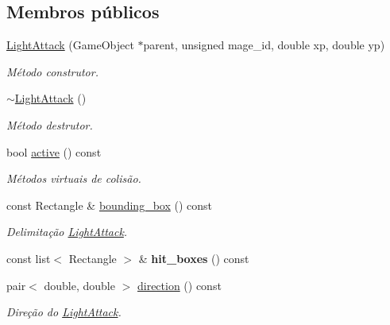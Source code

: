 \subsection*{Membros públicos}
\begin{DoxyCompactItemize}
\item 
\mbox{\hyperlink{classLightAttack_a85172d92441b302e99c4209df40792e6}{Light\+Attack}} (Game\+Object $\ast$parent, unsigned mage\+\_\+id, double xp, double yp)
\begin{DoxyCompactList}\small\item\em Método construtor. \end{DoxyCompactList}\item 
\mbox{\hyperlink{classLightAttack_acd73b8d61fd269e6077555a50e674cfb}{$\sim$\+Light\+Attack}} ()
\begin{DoxyCompactList}\small\item\em Método destrutor. \end{DoxyCompactList}\item 
bool \mbox{\hyperlink{classLightAttack_a69d89dd9e2374379fcdf6f464e87707c}{active}} () const
\begin{DoxyCompactList}\small\item\em Métodos virtuais de colisão. \end{DoxyCompactList}\item 
\mbox{\label{classLightAttack_a9fa4f72585e6666f40ea55d539e40fe4}} 
const Rectangle \& \mbox{\hyperlink{classLightAttack_a9fa4f72585e6666f40ea55d539e40fe4}{bounding\+\_\+box}} () const
\begin{DoxyCompactList}\small\item\em Delimitação \mbox{\hyperlink{classLightAttack}{Light\+Attack}}. \end{DoxyCompactList}\item 
\mbox{\label{classLightAttack_aa547d66653570e9a989aed007f42919b}} 
const list$<$ Rectangle $>$ \& {\bfseries hit\+\_\+boxes} () const
\item 
\mbox{\label{classLightAttack_a45cd647fcbb73023ea7f7d7fde647688}} 
pair$<$ double, double $>$ \mbox{\hyperlink{classLightAttack_a45cd647fcbb73023ea7f7d7fde647688}{direction}} () const
\begin{DoxyCompactList}\small\item\em Direção do \mbox{\hyperlink{classLightAttack}{Light\+Attack}}. \end{DoxyCompactList}\end{DoxyCompactItemize}
